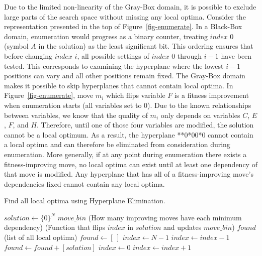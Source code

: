 \documentclass[runningheads,a4paper]{llncs}
\begin{document}
Due to the limited non-linearity of the Gray-Box domain, it is possible to exclude large
parts of the search space without missing any local optima.
Consider the representation presented in the top of Figure~\ref{fig-enumerate}. In a Black-Box
domain, enumeration would progress as a binary counter, treating $index$ 0 (symbol $A$ in the solution) as
the least significant bit. This ordering ensures that before changing $index$ $i$, all possible settings of $index$
0 through $i-1$ have been tested. This corresponds to examining the hyperplane where the lowest $i-1$ positions
can vary and all other positions remain fixed. The Gray-Box domain makes it possible to skip hyperplanes
that cannot contain local optima. In Figure~\ref{fig-enumerate}, move $m_i$ which flips variable $F$ is a fitness improvement
when enumeration starts (all variables set to 0). Due to the known relationships between variables,
we know that the quality of $m_i$ only depends on variables $C$, $E$, $F$, and $H$.
Therefore, until one of those four variables are modified, the solution cannot be a local optimum.
As a result, the hyperplane **0*00*0 cannot contain a local optima and can
therefore be eliminated from consideration during enumeration.
More generally, if at any point during enumeration
there exists a fitness-improving move, no local optima can exist until at least one
dependency of that move is modified. Any hyperplane that has all of a fitness-improving
move's dependencies fixed cannot contain any local optima.

\begin{algorithm}
  \caption{Find all local optima using Hyperplane Elimination.}
  \label{alg-enumerate}
  \begin{algorithmic}[1]
    \Require $solution \leftarrow \{0\}^N$
    \Require $move\_bin$ (How many improving moves have each minimum dependency)
    \Require {} (Function that flips $index$ in $solution$ and updates $move\_bin$)
    \Ensure $found$ (list of all local optima)
    \State $found \leftarrow [~]$
    \State $index \leftarrow N-1$
      \label{alg-enumerate-bincheck}
        \State $index \leftarrow index-1$
      \EndWhile
        \State $found \leftarrow found + [solution]$
        \State $index \leftarrow 0$
      \EndIf
      \label{alg-enumerate-counter}
        \State {}
        \State $index \leftarrow index + 1$
      \EndWhile
        \State {}\label{alg-enumerate-insert}
      \EndIf
    \EndWhile
  \end{algorithmic}
\end{algorithm}
\end{document}

